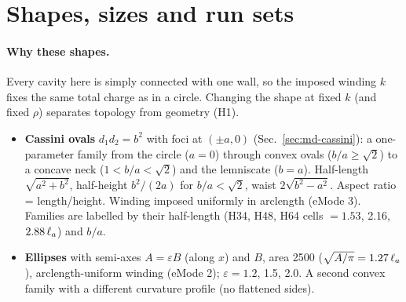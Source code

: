 \section{Shapes, sizes and run sets}\label{sec:ssetup}
\paragraph{Why these shapes.} Every cavity here is simply connected with one wall, so the imposed winding $k$ fixes the same
total charge as in a circle. Changing the shape at fixed $k$ (and fixed $\rho$) separates topology from geometry (H1).
\begin{itemize}
  \item \textbf{Cassini ovals} $d_1d_2=b^2$ with foci at $(\pm a,0)$ (Sec.~\ref{sec:md-cassini}): a one-parameter family from the
        circle ($a=0$) through convex ovals ($b/a\ge\sqrt2$) to a concave neck ($1<b/a<\sqrt2$) and the lemniscate ($b=a$).
        Half-length $\sqrt{a^2+b^2}$, half-height $b^2/(2a)$ for $b/a<\sqrt2$, waist $2\sqrt{b^2-a^2}$. Aspect ratio = length/height.
        Winding imposed uniformly in arclength (eMode 3). Families are labelled by their half-length (H34, H48, H64 cells $=1.53$,
        2.16, $2.88\,\ell_a$) and $b/a$.
  \item \textbf{Ellipses} with semi-axes $A=\varepsilon B$ (along $x$) and $B$, area 2500 ($\sqrt{A/\pi}=1.27\,\ell_a$), arclength-uniform
        winding (eMode 2); $\varepsilon=1.2$, 1.5, 2.0. A second convex family with a different curvature profile (no flattened sides).
\end{itemize}

